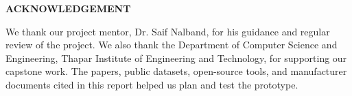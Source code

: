 \begin{center}
{\Large\textbf{ACKNOWLEDGEMENT}}\\
\vspace{0.5cm}
\end{center}

We thank our project mentor, Dr. Saif Nalband, for his guidance and regular
review of the project. We also thank the Department of Computer Science and
Engineering, Thapar Institute of Engineering and Technology, for supporting
our capstone work. The papers, public datasets, open-source tools, and
manufacturer documents cited in this report helped us plan and test the
prototype.
\clearpage
